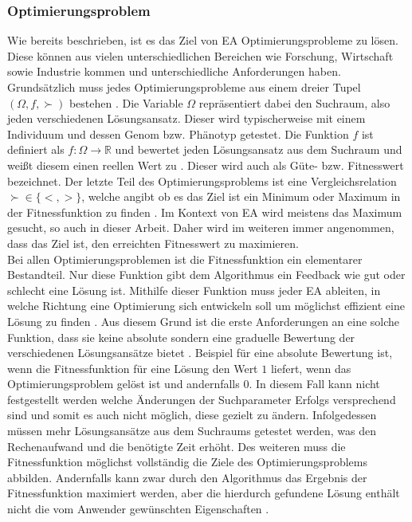 \subsubsection{Optimierungsproblem}
Wie bereits beschrieben, ist es das Ziel von \ac{EA} Optimierungsprobleme zu lösen. Diese können aus vielen unterschiedlichen Bereichen wie Forschung, Wirtschaft sowie Industrie kommen \cite{weicker2015evolutionare} und unterschiedliche Anforderungen haben. Grundsätzlich muss jedes Optimierungsprobleme aus einem dreier Tupel $(\Omega, f, \succ)$ bestehen \cite{weicker2015evolutionare}. Die Variable $\Omega$ repräsentiert dabei den Suchraum, also jeden verschiedenen Lösungsansatz. Dieser wird typischerweise mit einem Individuum und dessen Genom bzw. Phänotyp getestet. Die Funktion $f$ ist definiert als $f: \Omega \rightarrow \mathbb{R}$ und bewertet jeden Lösungsansatz aus dem Suchraum und weißt diesem einen reellen Wert zu \cite{weicker2015evolutionare}. Dieser wird auch als Güte- bzw. Fitnesswert bezeichnet. Der letzte Teil des Optimierungsproblems ist eine Vergleichsrelation $\succ \in \{<, >\}$, welche angibt ob es das Ziel ist ein Minimum oder Maximum in der Fitnessfunktion zu finden \cite{weicker2015evolutionare}. Im Kontext von \ac{EA} wird meistens das Maximum gesucht, so auch in dieser Arbeit. Daher wird im weiteren immer angenommen, dass das Ziel ist, den erreichten Fitnesswert zu maximieren.\\
Bei allen Optimierungsproblemen ist die Fitnessfunktion ein elementarer Bestandteil. Nur diese Funktion gibt dem Algorithmus ein Feedback wie gut oder schlecht eine Lösung ist. Mithilfe dieser Funktion muss jeder \ac{EA} ableiten, in welche Richtung eine Optimierung sich entwickeln soll um möglichst effizient eine Lösung zu finden \cite{weicker2015evolutionare}. Aus diesem Grund ist die erste Anforderungen an eine solche Funktion, dass sie keine absolute sondern eine graduelle Bewertung der verschiedenen Lösungsansätze bietet \cite{weicker2015evolutionare}. Beispiel für eine absolute Bewertung ist, wenn die Fitnessfunktion für eine Lösung den Wert $1$ liefert, wenn das Optimierungsproblem gelöst ist und andernfalls $0$. In diesem Fall kann nicht festgestellt werden welche Änderungen der Suchparameter Erfolgs versprechend sind und somit es auch nicht möglich, diese gezielt zu ändern. Infolgedessen müssen mehr Lösungsansätze aus dem Suchraums getestet werden, was den Rechenaufwand und die benötigte Zeit erhöht. Des weiteren muss die Fitnessfunktion möglichst vollständig die Ziele des Optimierungsproblems abbilden. Andernfalls kann zwar durch den Algorithmus das Ergebnis der Fitnessfunktion maximiert werden, aber die hierdurch gefundene Lösung enthält nicht die vom Anwender gewünschten Eigenschaften \cite{weicker2015evolutionare}.

